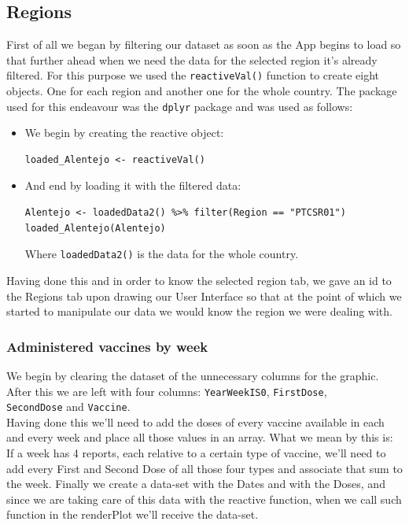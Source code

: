 \subsection{Regions}

First of all we began by filtering our dataset as soon as the App begins to load so that further ahead when we need the data for the selected region it's already filtered. For this purpose we used the \verb!reactiveVal()! function to create eight {} objects. One for each region and another one for the whole country. The package used for this endeavour was the \verb!dplyr! package and was used as follows:
\begin{itemize}
\item We begin by creating the reactive object:

\begin{verbatim}
loaded_Alentejo <- reactiveVal()
\end{verbatim}

\item And end by loading it with the filtered data:

\begin{verbatim}
Alentejo <- loadedData2() %>% filter(Region == "PTCSR01")
loaded_Alentejo(Alentejo)
\end{verbatim}

Where \verb!loadedData2()! is the data for the whole country.
\end{itemize}
Having done this and in order to know the selected region tab, we gave an id to the Regions tab upon drawing our User Interface so that at the point of which we started to manipulate our data we would know the region we were dealing with. 

\subsubsection{Administered vaccines by week}

We begin by clearing the dataset of the unnecessary columns for the graphic. After this we are left with four columns: \verb!YearWeekIS0!, \verb!FirstDose!,
\\
\verb!SecondDose! and \verb!Vaccine!. 
\\
Having done this we'll need to add the doses of every vaccine available in each and every week and place all those values in an array. What we mean by this is: If a week has 4 reports, each relative to a certain type of vaccine, we'll need to add every First and Second Dose of all those four types and associate that sum to the week.
Finally we create a data-set with the Dates and with the Doses, and since we are taking care of this data with the reactive function, when we call such function in the renderPlot we'll receive the data-set.

